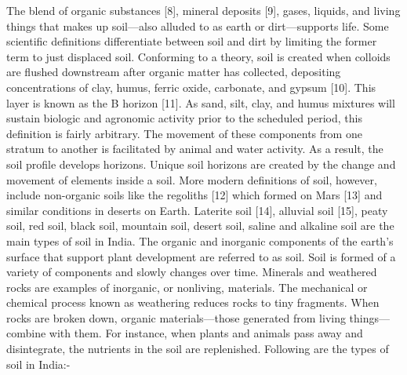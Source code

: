 \documentclass[conference]{IEEEtran}
\begin{document}
The blend of organic substances [8], mineral deposits [9], gases, liquids, and living things that makes up soil—also alluded to as earth or dirt—supports life. Some scientific definitions differentiate between soil and dirt by limiting the former term to just displaced soil. Conforming to a theory, soil is created when colloids are flushed downstream after organic matter has collected, depositing concentrations of clay, humus, ferric oxide, carbonate, and gypsum [10]. This layer is known as the B horizon [11]. As sand, silt, clay, and humus mixtures will sustain biologic and agronomic activity prior to the scheduled period, this definition is fairly arbitrary. The movement of these components from one stratum to another is facilitated by animal and water activity. As a result, the soil profile develops horizons. Unique soil horizons are created by the change and movement of elements inside a soil. More modern definitions of soil, however, include non-organic soils like the regoliths [12] which formed on Mars [13] and similar conditions in deserts on Earth. Laterite soil [14], alluvial soil [15], peaty soil, red soil, black soil, mountain soil, desert soil, saline and alkaline soil are the main types of soil in India. The organic and inorganic components of the earth's surface that support plant development are referred to as soil. Soil is formed of a variety of components and slowly changes over time. Minerals and weathered rocks are examples of inorganic, or nonliving, materials. The mechanical or chemical process known as weathering reduces rocks to tiny fragments. When rocks are broken down, organic materials—those generated from living things—combine with them. For instance, when plants and animals pass away and disintegrate, the nutrients in the soil are replenished. Following are the types of soil in India:-
\end{document}
